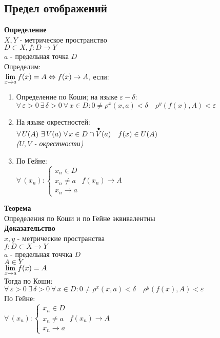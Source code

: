 \documentclass[12pt]{article}
\begin{document}
\subsection{Предел отображений}
\textbf{Определение}\\
$X, Y$ - метрическое пространство\\
$D\subset X, f:D\rightarrow Y$\\
$a$ - предельная точка $D$\\
Определим:\\
$\lim\limits_{x\rightarrow a} f(x) = A \Leftrightarrow f(x)\rightarrow A$, если:
\begin{enumerate}
    \item Определение по Коши; на языке $\varepsilon-\delta$:\\
    $\forall\,\varepsilon > 0\ \exists\,\delta>0\ \forall\,x\in D: 0\neq \rho^x(x,a)<\delta\quad\rho^y(f(x),A) < \varepsilon$
    \item На языке окрестностей:\\
    $\forall\,U(A)\ \exists\,V(a)\ \forall\,x\in D \cap \overset{\bullet}{V}(a)\quad f(x)\in U(A)$\\
    \textit{($U, V$ - окрестности)}
    \item По Гейне:\\
    $\forall\,(x_n): \left\{\begin{array}{l}
        x_n \in D  \\
        x_n \neq a\\
        x_n \rightarrow a
    \end{array}\right.\ f(x_n)\rightarrow A$
\end{enumerate}
\textbf{Теорема}\\
Определения по Коши и по Гейне эквивалентны\\
\textbf{Доказательство}\\
$x,y$ - метрические пространства\\
$f:D\subset X \rightarrow Y$\\
$a$ - предельная точчка $D$\\
$A \in Y$\\
$\lim\limits_{x\rightarrow a} f(x) = A$\\
Тогда по Коши:\\
$\forall\,\varepsilon > 0\ \exists\,\delta>0\ \forall\,x\in D: 0\neq \rho^x(x,a)<\delta\quad\rho^y(f(x),A) < \varepsilon$\\
По Гейне:\\
$\forall\,(x_n): \left\{\begin{array}{l}
        x_n \in D  \\
        x_n \neq a\\
        x_n \rightarrow a
\end{array}\right.\ f(x_n)\rightarrow A$
\end{document}
